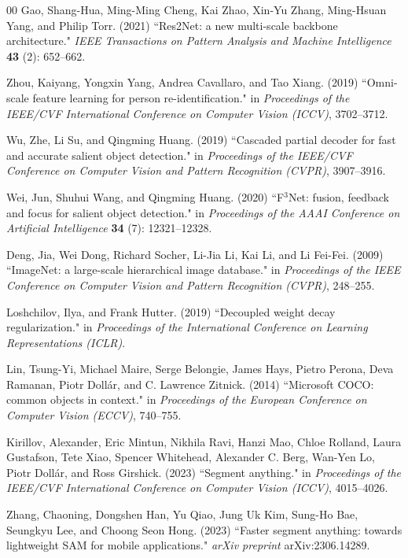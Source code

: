 \documentclass[3p,times,procedia]{elsarticle}
\begin{document}
\begin{thebibliography}{00}
{G}ao, Shang-Hua, Ming-Ming Cheng, Kai Zhao, Xin-Yu Zhang, Ming-Hsuan Yang, and Philip Torr. (2021) ``Res2Net: a new multi-scale backbone architecture." {\it IEEE Transactions on Pattern Analysis and Machine Intelligence} {\bf 43} (2): 652--662.

{Z}hou, Kaiyang, Yongxin Yang, Andrea Cavallaro, and Tao Xiang. (2019) ``Omni-scale feature learning for person re-identification." in {\it Proceedings of the IEEE/CVF International Conference on Computer Vision (ICCV)}, 3702--3712.

{W}u, Zhe, Li Su, and Qingming Huang. (2019) ``Cascaded partial decoder for fast and accurate salient object detection." in {\it Proceedings of the IEEE/CVF Conference on Computer Vision and Pattern Recognition (CVPR)}, 3907--3916.

{W}ei, Jun, Shuhui Wang, and Qingming Huang. (2020) ``F$^3$Net: fusion, feedback and focus for salient object detection." in {\it Proceedings of the AAAI Conference on Artificial Intelligence} {\bf 34} (7): 12321--12328.

{D}eng, Jia, Wei Dong, Richard Socher, Li-Jia Li, Kai Li, and Li Fei-Fei. (2009) ``ImageNet: a large-scale hierarchical image database." in {\it Proceedings of the IEEE Conference on Computer Vision and Pattern Recognition (CVPR)}, 248--255.

{L}oshchilov, Ilya, and Frank Hutter. (2019) ``Decoupled weight decay regularization." in {\it Proceedings of the International Conference on Learning Representations (ICLR)}.

{L}in, Tsung-Yi, Michael Maire, Serge Belongie, James Hays, Pietro Perona, Deva Ramanan, Piotr Doll\'{a}r, and C. Lawrence Zitnick. (2014) ``Microsoft COCO: common objects in context." in {\it Proceedings of the European Conference on Computer Vision (ECCV)}, 740--755.

{K}irillov, Alexander, Eric Mintun, Nikhila Ravi, Hanzi Mao, Chloe Rolland, Laura Gustafson, Tete Xiao, Spencer Whitehead, Alexander C. Berg, Wan-Yen Lo, Piotr Doll\'{a}r, and Ross Girshick. (2023) ``Segment anything." in {\it Proceedings of the IEEE/CVF International Conference on Computer Vision (ICCV)}, 4015--4026.

{Z}hang, Chaoning, Dongshen Han, Yu Qiao, Jung Uk Kim, Sung-Ho Bae, Seungkyu Lee, and Choong Seon Hong. (2023) ``Faster segment anything: towards lightweight SAM for mobile applications." {\it arXiv preprint} arXiv:2306.14289.


\end{thebibliography}
\end{document}
